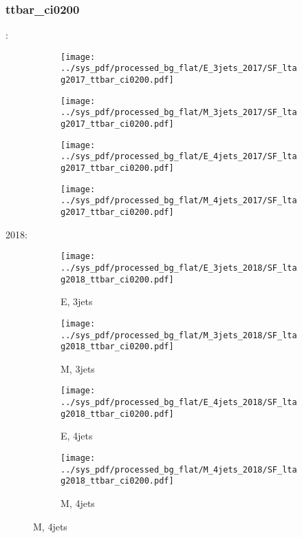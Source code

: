 \documentclass{beamer}
\begin{document}
\begin{frame}
\frametitle{ttbar_ci0200}
\fontsize{5}{1}:
\begin{figure}
\centering
\begin{subfigure}[b]{0.24\textwidth}
\texttt{[image: ../sys\_pdf/processed\_bg\_flat/E\_3jets\_2017/SF\_ltag2017\_ttbar\_ci0200.pdf]}
\end{subfigure}
\begin{subfigure}[b]{0.24\textwidth}
\texttt{[image: ../sys\_pdf/processed\_bg\_flat/M\_3jets\_2017/SF\_ltag2017\_ttbar\_ci0200.pdf]}
\end{subfigure}
\begin{subfigure}[b]{0.24\textwidth}
\texttt{[image: ../sys\_pdf/processed\_bg\_flat/E\_4jets\_2017/SF\_ltag2017\_ttbar\_ci0200.pdf]}
\end{subfigure}
\begin{subfigure}[b]{0.24\textwidth}
\texttt{[image: ../sys\_pdf/processed\_bg\_flat/M\_4jets\_2017/SF\_ltag2017\_ttbar\_ci0200.pdf]}
\end{subfigure}
\end{figure}
2018:
\begin{figure}
\centering
\begin{subfigure}[b]{0.24\textwidth}
\texttt{[image: ../sys\_pdf/processed\_bg\_flat/E\_3jets\_2018/SF\_ltag2018\_ttbar\_ci0200.pdf]}
\captionsetup{font=tiny}
\caption{E, 3jets}
\end{subfigure}
\begin{subfigure}[b]{0.24\textwidth}
\texttt{[image: ../sys\_pdf/processed\_bg\_flat/M\_3jets\_2018/SF\_ltag2018\_ttbar\_ci0200.pdf]}
\captionsetup{font=tiny}
\caption{M, 3jets}
\end{subfigure}
\begin{subfigure}[b]{0.24\textwidth}
\texttt{[image: ../sys\_pdf/processed\_bg\_flat/E\_4jets\_2018/SF\_ltag2018\_ttbar\_ci0200.pdf]}
\captionsetup{font=tiny}
\caption{E, 4jets}
\end{subfigure}
\begin{subfigure}[b]{0.24\textwidth}
\texttt{[image: ../sys\_pdf/processed\_bg\_flat/M\_4jets\_2018/SF\_ltag2018\_ttbar\_ci0200.pdf]}
\captionsetup{font=tiny}
\caption{M, 4jets}
\end{subfigure}
\end{figure}
\end{frame}
\end{document}
